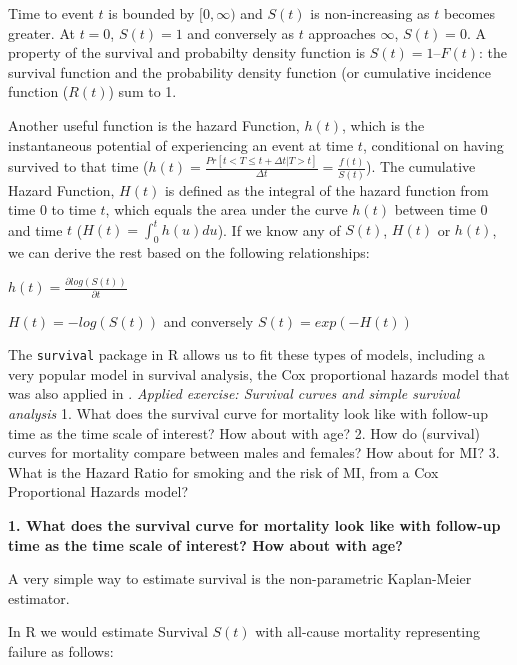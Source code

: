 \documentclass[
]{book}
\newenvironment{Shaded}{\begin{snugshade}}{\end{snugshade}}
\newcommand{\FunctionTok}[1]{\textcolor[rgb]{0.00,0.00,0.00}{#1}}
\newcommand{\NormalTok}[1]{#1}
\newcommand{\OtherTok}[1]{\textcolor[rgb]{0.56,0.35,0.01}{#1}}
\newcommand{\SpecialCharTok}[1]{\textcolor[rgb]{0.00,0.00,0.00}{#1}}
\begin{document}
Time to event \(t\) is bounded by \([0,\infty)\) and \(S(t)\) is non-increasing as \(t\) becomes greater. At \(t=0\), \(S(t)=1\) and conversely as \(t\) approaches \(\infty\), \(S(t)=0\). A property of the survival and probabilty density function is \(S(t) = 1 – F(t)\): the survival function and the probability density function (or cumulative incidence function (\(R(t)\)) sum to 1.

Another useful function is the hazard Function, \(h(t)\), which is the instantaneous potential of experiencing an event at time \(t\), conditional on having survived to that time (\(h(t)=\frac{Pr[t<T\leq t+\Delta t|T>t]}{\Delta t}=\frac{f(t)}{S(t)}\)). The cumulative Hazard Function, \(H(t)\) is defined as the integral of the hazard function from time \(0\) to time \(t\), which equals the area under the curve \(h(t)\) between time \(0\) and time \(t\) (\(H(t)=\int_{0}^{t}h(u)du\)).
If we know any of \(S(t)\), \(H(t)\) or \(h(t)\), we can derive the rest based on the following relationships:

\(h(t)=\frac{\partial log(S(t))}{\partial t}\)

\(H(t)=-log(S(t))\) and conversely \(S(t)=exp(-H(t))\)

The \texttt{survival} package in R allows us to fit these types of models, including a very popular model in survival analysis, the Cox proportional hazards model that was also applied in \citet{wong1989risk}.
\emph{Applied exercise: Survival curves and simple survival analysis}
1. What does the survival curve for mortality look like with follow-up time as the time scale of interest? How about with age?
2. How do (survival) curves for mortality compare between males and females? How about for MI?
3. What is the Hazard Ratio for smoking and the risk of MI, from a Cox Proportional Hazards model?

\textbf{1. What does the survival curve for mortality look like with follow-up time as the time scale of interest? How about with age?}

A very simple way to estimate survival is the non-parametric Kaplan-Meier estimator.

In R we would estimate Survival \(S(t)\) with all-cause mortality representing failure as follows:

\begin{Shaded}
\end{Shaded}
\end{document}
